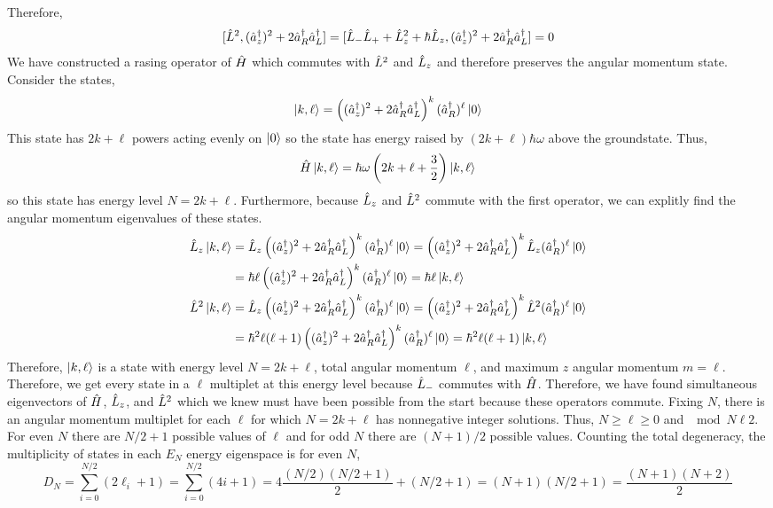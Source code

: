 \documentclass[12pt]{extarticle}
\begin{document}
Therefore, 
\[ [\hat{L}^2, (\hat{a}^\dagger_z)^2 + 2 \hat{a}^\dagger_R \hat{a}^\dagger_L] = [\hat{L}_{-} \hat{L}_{+} + \hat{L}_{z}^2 + \hbar \hat{L}_{z}, (\hat{a}^\dagger_z)^2 + 2 \hat{a}^\dagger_R \hat{a}^\dagger_L ]  = 0 \]
We have constructed a rasing operator of $\hat{H}$ which commutes with $\hat{L}^2$ and $\hat{L}_z$ and therefore preserves the angular momentum state. Consider the states,
\[ \left| k, \ell \right> = \left( (\hat{a}^\dagger_z)^2 + 2 \hat{a}^\dagger_R \hat{a}^\dagger_L \right)^k (\hat{a}^\dagger_R)^\ell \left| 0 \right>\] 
This state has $2k + \ell$ powers acting evenly on $\left| 0 \right>$ so the state has energy raised by $(2k + \ell) \hbar \omega$ above the groundstate. Thus, \[\hat{H} \left| k, \ell \right> = \hbar \omega \left( 2k + \ell + \frac{3}{2} \right) \left| k, \ell \right>\]
so this state has energy level $N = 2k + \ell$. Furthermore, because $\hat{L}_z$ and $\hat{L}^2$ commute with the first operator, we can explitly find the angular momentum eigenvalues of these states. 
\begin{align*}
\hat{L}_{z} \left| k, \ell \right> & = \hat{L}_{z} \left( (\hat{a}^\dagger_z)^2 + 2 \hat{a}^\dagger_R \hat{a}^\dagger_L \right)^k (\hat{a}^\dagger_R)^\ell \left| 0 \right> = \left( (\hat{a}^\dagger_z)^2 + 2 \hat{a}^\dagger_R \hat{a}^\dagger_L \right)^k \hat{L}_{z} (\hat{a}^\dagger_R)^\ell \left| 0 \right> \\ & = \hbar \ell \left( (\hat{a}^\dagger_z)^2 + 2 \hat{a}^\dagger_R \hat{a}^\dagger_L \right)^k  (\hat{a}^\dagger_R)^\ell \left| 0 \right> = \hbar \ell \left| k, \ell \right> \\
\hat{L}^2 \left| k, \ell \right> & = \hat{L}_{z} \left( (\hat{a}^\dagger_z)^2 + 2 \hat{a}^\dagger_R \hat{a}^\dagger_L \right)^k (\hat{a}^\dagger_R)^\ell \left| 0 \right> = \left( (\hat{a}^\dagger_z)^2 + 2 \hat{a}^\dagger_R \hat{a}^\dagger_L \right)^k \hat{L}^2 (\hat{a}^\dagger_R)^\ell \left| 0 \right> \\ & = \hbar^2 \ell (\ell + 1) \left( (\hat{a}^\dagger_z)^2 + 2 \hat{a}^\dagger_R \hat{a}^\dagger_L \right)^k  (\hat{a}^\dagger_R)^\ell \left| 0 \right> = \hbar^2 \ell (\ell + 1) \left| k, \ell \right> 
\end{align*} 
Therefore, $\left| k, \ell \right>$ is a state with energy level $N = 2k + \ell$, total angular momentum $\ell$, and maximum $z$ angular momentum $m = \ell$. Therefore, we get every state in a $\ell$ multiplet at this energy level because $\hat{L}_{-}$ commutes with $\hat{H}$. Therefore, we have found simultaneous eigenvectors of $\hat{H}$, $\hat{L}_z$, and $\hat{L}^2$ which we knew must have been possible from the start because these operators commute. Fixing $N$, there is an angular momentum multiplet for each $\ell$ for which $N = 2 k + \ell$ has nonnegative integer solutions. Thus, $N \ge \ell \ge 0$ and $\mod{N}{\ell}{2}$. For even $N$ there are $N/2 + 1$ possible values of $\ell$ and for odd $N$ there are $(N+1)/2$ possible values. Counting the total degeneracy, the multiplicity of states in each $E_N$ energy eigenspace is for even $N$,
\[ D_N =
\sum_{i = 0}^{N/2} (2 \ell_i + 1) = \sum_{i = 0}^{N/2} (4i + 1) = 4 \frac{(N/2)(N/2+1)}{2} + (N/2 + 1) = (N+1)(N/2 + 1) = \frac{(N + 1)(N + 2)}{2} \]
\end{document}
